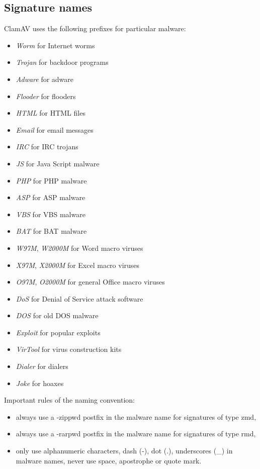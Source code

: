 \documentclass[a4paper,titlepage,12pt]{article}
\begin{document}
    \subsection{Signature names}
    ClamAV uses the following prefixes for particular malware:
    \begin{itemize}
	\item \emph{Worm} for Internet worms
	\item \emph{Trojan} for backdoor programs
	\item \emph{Adware} for adware
	\item \emph{Flooder} for flooders
        \item \emph{HTML} for HTML files
        \item \emph{Email} for email messages
        \item \emph{IRC} for IRC trojans
	\item \emph{JS} for Java Script malware
	\item \emph{PHP} for PHP malware
	\item \emph{ASP} for ASP malware
	\item \emph{VBS} for VBS malware
	\item \emph{BAT} for BAT malware
	\item \emph{W97M}, \emph{W2000M} for Word macro viruses
	\item \emph{X97M}, \emph{X2000M} for Excel macro viruses
	\item \emph{O97M}, \emph{O2000M} for general Office macro viruses
	\item \emph{DoS} for Denial of Service attack software
	\item \emph{DOS} for old DOS malware
	\item \emph{Exploit} for popular exploits
	\item \emph{VirTool} for virus construction kits
	\item \emph{Dialer} for dialers
	\item \emph{Joke} for hoaxes
    \end{itemize}
    Important rules of the naming convention:
    \begin{itemize}
	\item always use a -zippwd postfix in the malware name for signatures of	      type zmd,
	\item always use a -rarpwd postfix in the malware name for signatures
	      of type rmd,
	\item only use alphanumeric characters, dash (-), dot (.), underscores
	      (\_) in malware names, never use space, apostrophe or quote mark.
    \end{itemize}
\end{document}

